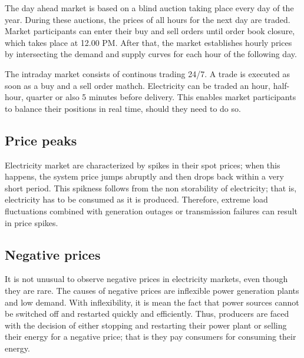 The day ahead market is based on a blind auction taking place every day of the year.
During these auctions, the prices of all hours for the next day are traded.
Market participants can enter their buy and sell orders until order book closure, which takes place at 12.00 PM. After that, the market establishes hourly prices by intersecting the demand and supply curves for each hour of the following day.

The intraday market consists of continous trading 24/7. A trade is executed as soon as a buy and a sell order mathch. Electricity can be traded an hour, half-hour, quarter or also 5 minutes before delivery. This enables market participants to balance their positions in real time, should they need to do so.

\subsection{Price peaks}
Electricity market are characterized by spikes in their spot prices; when this happens, the system price jumps abruptly and then drops back within a very short period.
This spikness follows from the non storability of electricity; that is, electricity has to be consumed as it is produced. Therefore, extreme load fluctuations combined with generation outages or transmission failures can result in price spikes.

\subsection{Negative prices}
It is not unusual to observe negative prices in electricity markets, even though they are rare.
The causes of negative prices are inflexible power generation plants and low demand. With inflexibility, it is mean the fact that power sources cannot be switched off and restarted quickly and efficiently.
Thus, producers are faced with the decision of either stopping and restarting their power plant or selling their energy for a negative price; that is they pay consumers for consuming their energy.

